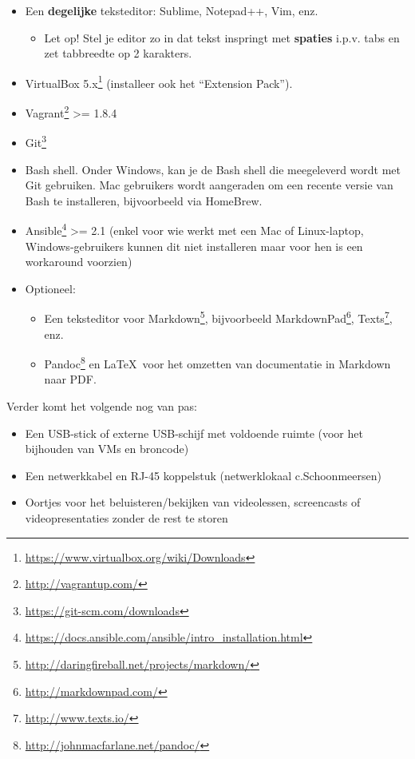 \begin{itemize}
\item Een \textbf{degelijke} teksteditor: Sublime, Notepad++, Vim, enz.
  \begin{itemize}
  \item Let op! Stel je editor zo in dat tekst inspringt met \textbf{spaties} i.p.v. tabs en zet tabbreedte op 2 karakters.
  \end{itemize}
\item VirtualBox 5.x\footnote{\url{https://www.virtualbox.org/wiki/Downloads}} (installeer ook het ``Extension Pack'').
\item Vagrant\footnote{\url{http://vagrantup.com/}} \textgreater{}= 1.8.4
\item Git\footnote{\url{https://git-scm.com/downloads}}
\item Bash shell. Onder Windows, kan je de Bash shell die meegeleverd wordt met Git gebruiken. Mac gebruikers wordt aangeraden om een recente versie van Bash te installeren, bijvoorbeeld via HomeBrew.
\item Ansible\footnote{\url{https://docs.ansible.com/ansible/intro_installation.html}} \textgreater{}= 2.1 (enkel voor wie werkt met een Mac of Linux-laptop, Windows-gebruikers kunnen dit niet installeren maar voor hen is een workaround voorzien)
\item Optioneel:

  \begin{itemize}
    \item Een teksteditor voor Markdown\footnote{\url{http://daringfireball.net/projects/markdown/}}, bijvoorbeeld MarkdownPad\footnote{\url{http://markdownpad.com/}}, Texts\footnote{\url{http://www.texts.io/}}, enz.
  \item Pandoc\footnote{\url{http://johnmacfarlane.net/pandoc/}} en \LaTeX\ voor het
    omzetten van documentatie in Markdown naar PDF.
  \end{itemize}
\end{itemize}

Verder komt het volgende nog van pas:

\begin{itemize}
\item Een USB-stick of externe USB-schijf met voldoende ruimte (voor het bijhouden van VMs en broncode)
\item Een netwerkkabel en RJ-45 koppelstuk (netwerklokaal c.Schoonmeersen)
\item Oortjes voor het beluisteren/bekijken van videolessen, screencasts of videopresentaties zonder de rest te storen
\end{itemize}


